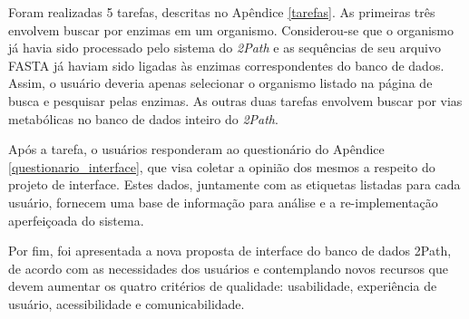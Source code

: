 \indent Foram realizadas 5 tarefas, descritas no Apêndice \ref{tarefas}. As primeiras três envolvem buscar por enzimas em um organismo. Considerou-se que o organismo já havia sido processado pelo sistema do \textit{2Path} e as sequências de seu arquivo FASTA já haviam sido ligadas às enzimas correspondentes do banco de dados. Assim, o usuário deveria apenas selecionar o organismo listado na página de busca e pesquisar pelas enzimas. As outras duas tarefas envolvem buscar por vias metabólicas no banco de dados inteiro do \textit{2Path}.

\indent Após a tarefa, o usuários responderam ao questionário do Apêndice \ref{questionario_interface}, que visa coletar a opinião dos mesmos a respeito do projeto de interface. Estes dados, juntamente com as etiquetas listadas para cada usuário, fornecem uma base de informação para análise e a re-implementação aperfeiçoada do sistema.

\indent Por fim, foi apresentada a nova proposta de interface do banco de dados 2Path, de acordo com as necessidades dos usuários e contemplando novos recursos que devem aumentar os quatro critérios de qualidade: usabilidade, experiência de usuário, acessibilidade e comunicabilidade.